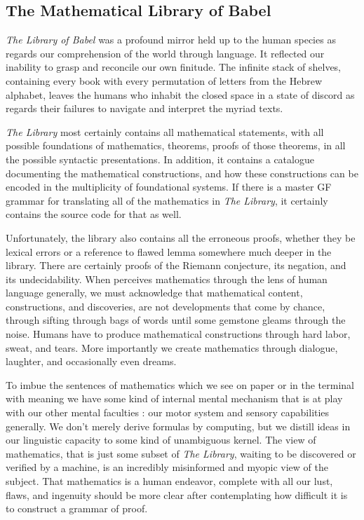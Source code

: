 \subsection{The Mathematical Library of Babel}

\emph{The Library of Babel} \cite{borges} was a profound mirror held up to the human species
as regards our comprehension of the world through language. It reflected our
inability to grasp and reconcile our own finitude. The infinite stack of
shelves, containing every book with every permutation of letters from the Hebrew
alphabet, leaves the humans who inhabit the closed space in a state of discord
as regards their failures to navigate and interpret the myriad texts.

\emph{The Library} most certainly contains all mathematical statements, with all
possible foundations of mathematics, theorems, proofs of those theorems, in all
the possible syntactic presentations. In addition, it contains a catalogue
documenting the mathematical constructions, and how these constructions can be
encoded in the multiplicity of foundational systems. If there is a master GF
grammar for translating all of the mathematics in \emph{The Library}, it certainly
contains the source code for that as well.

Unfortunately, the library also contains all the erroneous proofs, whether they
be lexical errors or a reference to flawed lemma somewhere much deeper in the
library. There are certainly proofs of the Riemann conjecture, its negation, and
its undecidability. When perceives mathematics through the lens of human
language generally, we must acknowledge that mathematical content,
constructions, and discoveries, are not developments that come by chance,
through sifting through bags of words until some gemstone gleams through the
noise. Humans have to produce mathematical constructions through hard labor,
sweat, and tears. More importantly we create mathematics through dialogue,
laughter, and occasionally even dreams.

To imbue the sentences of mathematics which we see on paper or in the terminal
with meaning we have some kind of internal mental mechanism that is at play with
our other mental faculties : our motor system and sensory capabilities generally.
We don't merely derive formulas by computing, but we distill ideas in our
linguistic capacity to some kind of unambiguous kernel. The view of mathematics,
that is just some subset of \emph{The Library}, waiting to be discovered or verified by a
machine, is an incredibly misinformed and myopic view of the subject. That
mathematics is a human endeavor, complete with all our lust, flaws, and
ingenuity should be more clear after contemplating how difficult it is to
construct a grammar of proof.


